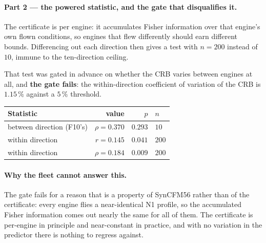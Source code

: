 \paragraph{Part 2 --- the powered statistic, and the gate that disqualifies it.} The certificate
is per engine: it accumulates Fisher information over that engine's own flown conditions, so
engines that flew differently should earn different bounds. Differencing out each direction then
gives a test with $n = 200$ instead of $10$, immune to the ten-direction ceiling.

That test was gated in advance on whether the CRB varies between engines at all, and
\textbf{the gate fails}: the within-direction coefficient of variation of the CRB is
$\mathbf{1.15\,\%}$ against a $5\,\%$ threshold.

\begin{center}\small
\begin{tabular}{@{}lrrl@{}}
  \toprule
  Statistic & value & $p$ & $n$ \\
  \midrule
  between direction (F10's) & $\rho = 0.370$ & $0.293$ & $10$ \\
  within direction & $r = 0.145$ & $0.041$ & $200$ \\
  within direction & $\rho = 0.184$ & $0.009$ & $200$ \\
  \bottomrule
\end{tabular}
\end{center}


\paragraph{Why the fleet cannot answer this.} The gate fails for a reason that is a property of
SynCFM56 rather than of the certificate: every engine flies a near-identical N1 profile, so the
accumulated Fisher information comes out nearly the same for all of them. The certificate is
per-engine in principle and near-constant in practice, and with no variation in the predictor
there is nothing to regress against.

